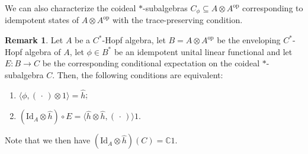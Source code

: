 \documentclass[a4paper,10pt]{amsart}
\newcommand{\eval}[2]{\langle #1 , #2\rangle}
\newcommand{\placeholder}{\,\cdot\,}
\theoremstyle{definition}
\newtheorem{remark}[theorem]{Remark}
\begin{document}
We can also characterize the coideal $*$-subalgebras $C_\phi \subseteq A\otimes A^{\mathrm{op}}$ corresponding to idempotent states of $A\otimes A^{\mathrm{op}}$ with the trace-preserving condition.
\begin{remark}
Let $A$ be a $C^*$-Hopf algebra, let $B=A\otimes A^{\mathrm{op}}$ be the enveloping $C^*$-Hopf algebra of $A$, let $\phi\in B^*$ be an idempotent unital linear functional and let $E: B \to C$ be the corresponding conditional expectation on the coideal $*$-subalgebra $C$. Then, the following conditions are equivalent:
\begin{enumerate}
    \item[(i)] $\eval{\phi}{(\placeholder)\otimes 1}= \hat{h}$;
    \item[(ii)] $(\mathrm{Id}_A\otimes \hat{h})\circ E=\eval{\hat{h} \otimes \hat{h}}{(\placeholder)} 1$.
\end{enumerate}
Note that we then have $(\mathrm{Id}_A\otimes \hat{h})(C) = \mathbb{C}1$.
\end{remark}



\end{document}
